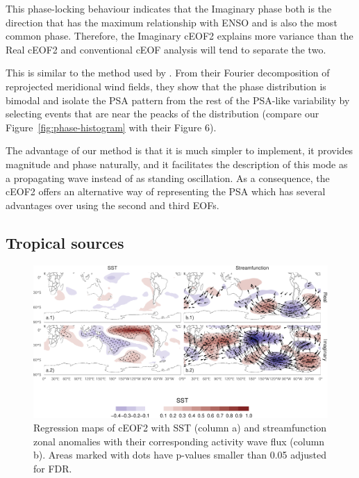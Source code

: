 \documentclass[smallextended]{svjour3}       %
\begin{document}
This phase-locking behaviour indicates that the Imaginary phase both is the direction that has the maximum relationship with ENSO and is also the most common phase. Therefore, the Imaginary cEOF2 explains more variance than the Real cEOF2 and conventional cEOF analysis will tend to separate the two.

This is similar to the method used by \citet{irving2016}. From their Fourier decomposition of reprojected meridional wind fields, they show that the phase distribution is bimodal and isolate the PSA pattern from the rest of the PSA-like variability by selecting events that are near the peacks of the distribution (compare our Figure~\ref{fig:phase-histogram} with their Figure 6).

The advantage of our method is that it is much simpler to implement, it provides magnitude and phase naturally, and it facilitates the description of this mode as a propagating wave instead of as standing oscillation. As a consequence, the cEOF2 offers an alternative way of representing the PSA which has several advantages over using the second and third EOFs.

\hypertarget{tropical-sources}{%
\subsection{Tropical sources}\label{tropical-sources}}



\begin{figure}
\includegraphics{../figures/sst-psi-2-1} \caption{Regression maps of cEOF2 with SST (column a) and streamfunction zonal anomalies with their corresponding activity wave flux (column b). Areas marked with dots have p-values smaller than 0.05 adjusted for FDR.}\label{fig:sst-psi-2}
\end{figure}
\end{document}
